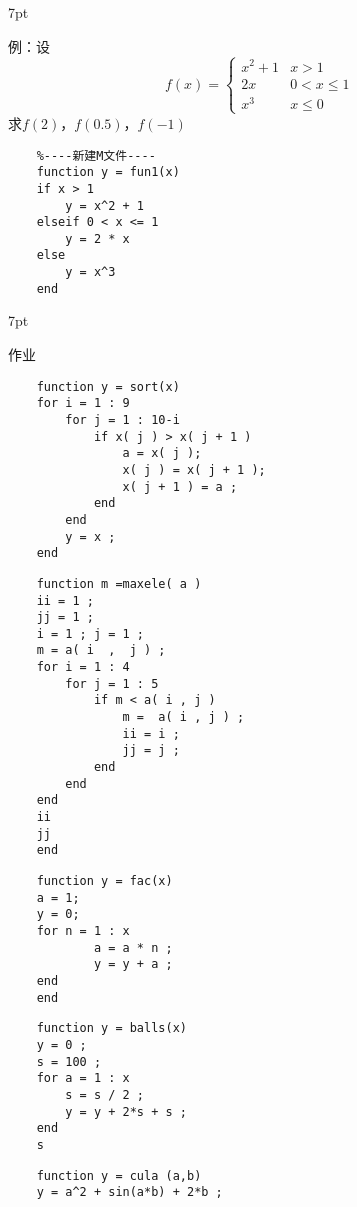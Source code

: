 \documentclass{article} %
\newenvironment{wa}{%
\def\FrameCommand{%
\hspace{1pt}%
{\color{LightCoral}\vrule width 2pt}%
{\color{washade}\vrule width 4pt}%
\colorbox{washade}%
}%
\MakeFramed{\advance\hsize-\width\FrameRestore}%
\noindent\hspace{-4.55pt}%
\begin{adjustwidth}{}{7pt}%
\vspace{2pt}\vspace{2pt}%
\normalfont %
}
{%
\vspace{2pt}\end{adjustwidth}\endMakeFramed%
}
\begin{document}
\begin{wa}
    例：设
    $$f(x) = 
    \begin{cases}
        x^{2} + 1 & x > 1\\
        2x & 0 < x \leqslant 1 \\
        x^{3} & x \leqslant 0
    \end{cases}
    $$
    \indent 求$f(2)$，$f(0.5)$，$f(-1)$
\end{wa}
\begin{lstlisting}
    %----新建M文件----
    function y = fun1(x)
    if x > 1
        y = x^2 + 1
    elseif 0 < x <= 1
        y = 2 * x
    else
        y = x^3
    end
\end{lstlisting}

\begin{wa}
    作业
\end{wa}
\begin{lstlisting}
    function y = sort(x)
    for i = 1 : 9
        for j = 1 : 10-i
            if x( j ) > x( j + 1 )
                a = x( j );
                x( j ) = x( j + 1 ); 
                x( j + 1 ) = a ;
            end
        end
        y = x ;
    end
\end{lstlisting}
\begin{lstlisting}
    function m =maxele( a ) 
    ii = 1 ;
    jj = 1 ;
    i = 1 ; j = 1 ; 
    m = a( i  ,  j ) ;
    for i = 1 : 4   
        for j = 1 : 5
            if m < a( i , j )
                m =  a( i , j ) ;
                ii = i ;
                jj = j ;
            end
        end
    end
    ii
    jj
    end
\end{lstlisting}
\begin{lstlisting}
    function y = fac(x)
    a = 1;
    y = 0;
    for n = 1 : x
            a = a * n ;
            y = y + a ;      
    end 
    end
\end{lstlisting}
\begin{lstlisting}
    function y = balls(x)
    y = 0 ;
    s = 100 ;
    for a = 1 : x
        s = s / 2 ;
        y = y + 2*s + s ;
    end
    s
\end{lstlisting}
\begin{lstlisting}
    function y = cula (a,b)
    y = a^2 + sin(a*b) + 2*b ;
\end{lstlisting}
\end{document}
